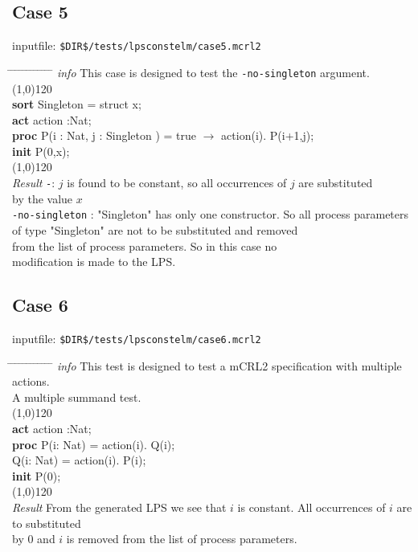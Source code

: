 \index{}\documentclass[a4paper,10pt]{article}
\theoremstyle{plain}
\theoremstyle{definition}
\newcommand{\pps}{process parameters}
\newcommand{\ti}{\textit}
\newcommand{\tb}{\textbf}
\newcommand{\tabw}{\hspace*{15.mm} \= \hspace*{20.mm} \= \hspace*{5.mm} \= \hspace*{5.mm} \= \hspace*{5.mm} \= \hspace*{5.mm}  \= \hspace*{5.mm}  \= \hspace*{5.mm}  \= \hspace*{5.mm} \= \hspace*{5.mm} \= \hspace*{5.mm}  \= \hspace*{5.mm}  \= \hspace*{5.mm}\kill}
\begin{document}
\subsection*{Case 5}
inputfile: \verb"$DIR$/tests/lpsconstelm/case5.mcrl2"
\begin{tabbing}
\tabw
\ti{info} \> This case is designed to test the \verb"-no-singleton" argument. \\
\line(1,0){120}\\
\tb{sort} \> Singleton = struct x; \\
\tb{act}  \> action :Nat; \\
\tb{proc} \>  P(i : Nat, j : Singleton ) = true $\rightarrow$ action(i). P(i+1,j); \\
\tb{init} \>  P(0,x); \\
\line(1,0){120}\\
\ti{Result} \>
\verb"-": \> \> $j$ is found to be constant, so all occurrences of $j$ are substituted  \\
\> \> \> by the value $x$\\
\> \verb"-no-singleton" : \> \> "Singleton" has only one constructor. So all \pps\  \\
\> \> \>                       of type "Singleton" are not to be substituted and removed  \\
\> \> \>                       from the list of \pps . So in this case no  \\
\> \> \>                       modification is made to the LPS.
\end{tabbing}
\newpage
\subsection*{Case 6}
inputfile: \verb"$DIR$/tests/lpsconstelm/case6.mcrl2"
\begin{tabbing}
\tabw
\ti{info} \> This test is designed to test a mCRL2 specification with multiple actions. \\
          \> A multiple summand test. \\
\line(1,0){120}\\
\tb{act} \> action :Nat;\\
\tb{proc} \> P(i: Nat) = \>  action(i). Q(i);\\
     \> Q(i: Nat) = \>  action(i). P(i);\\

\tb{init} \> P(0);\\
\line(1,0){120}\\
\ti{Result} \> From the generated LPS we see that $i$ is constant. All occurrences of $i$ are to substituted \\
 \> by 0 and $i$ is removed from the list of \pps .
\end{tabbing}
\end{document}
